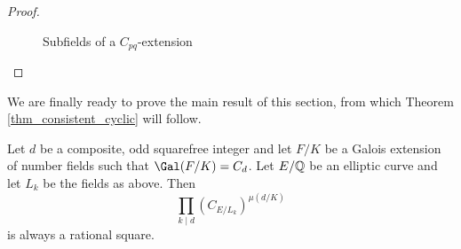 \begin{proof}
\begin{figure}[!ht]
        \caption[short]{Subfields of a $C_{pq}$-extension}
    \end{figure}
\end{proof}

We are finally ready to prove the main result of this section, from which Theorem \ref*{thm_consistent_cyclic} will follow. 

\begin{lemma}\label{lem_Cd_odd}
    Let $d$ be a composite, odd squarefree integer and let $F/K$ be a Galois extension of number fields such that $\Gal(F/K)=C_{d}$. Let $E/\mathbb{Q}$ be an elliptic curve and let $L_k$ be the fields as above. Then
    $$\prod_{k\mid d}(C_{E/L_k})^{\mu(d/K)}$$
    is always a rational square.
\end{lemma}

